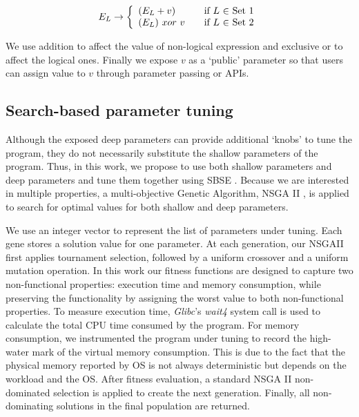 \begin{equation}
 E_L \rightarrow \left\{
  \begin{array}{l l}
    (E_L + v) & \quad \text{if $L$ $\in$ Set 1}\\
    (E_L) \ xor \ v & \quad \text{if $L$ $\in$ Set 2}
    \end{array} \right.
\end{equation}

We use addition to affect the value of non-logical expression and exclusive or to affect the logical ones.
Finally we expose $v$ as a `public' parameter so that users can assign value to $v$ through parameter passing or APIs.

\subsection{Search-based parameter tuning}
\label{sec_nsgaii}

Although the exposed deep parameters can provide additional `knobs' \cite{Hoffmann:2011:DKR:1950365.1950390} to tune the program, they do not necessarily substitute the shallow parameters of the program.  Thus, in this work, we propose to use both shallow parameters and deep parameters and tune them together using SBSE \cite{Harman:2007:CSF:1253532.1254729}. Because we are interested in multiple properties, a multi-objective Genetic Algorithm, NSGA II \cite{996017}, is applied to search for optimal values for both shallow and deep parameters.


We use an integer vector to represent the list of parameters under tuning. Each gene stores a solution value for one parameter. At each generation, our NSGAII first applies tournament selection, followed by a uniform crossover and a uniform mutation operation. In this work our fitness functions are designed to capture two non-functional properties: execution time and memory consumption, while preserving the functionality by assigning the worst value to both non-functional properties. To measure execution time, \emph{Glibc}'s \emph{wait4} system call is used to calculate the total CPU time consumed by the program. For memory consumption, we instrumented the program under tuning to record the high-water mark of the virtual memory consumption. This is due to the fact that the physical memory reported by OS is not always deterministic but depends on the workload and the OS. After fitness evaluation, a standard NSGA II non-dominated selection is applied to create the next generation. Finally, all non-dominating solutions in the final population are returned.
